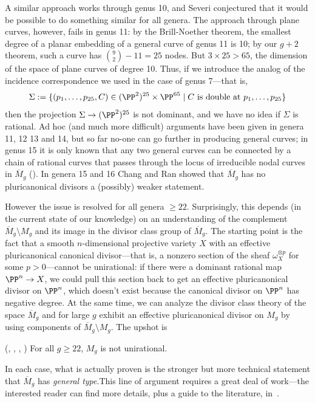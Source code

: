 A similar approach works through genus 10, and Severi conjectured that it would be possible to do something similar for all genera. The approach through plane curves, however, fails in genus 11: by the Brill-Noether theorem, the smallest degree of a planar embedding of a general curve of genus 11 is 10; by our $g+2$ theorem, such a curve has ${9\choose 2}-11 = 25$ nodes. But $3 \times 25 > 65$, the dimension of the space of plane curves of degree 10. Thus, if we introduce the analog of the incidence correspondence we used in the case of genus 7---that is,
$$
\Sigma := \{ (p_1,\dots,p_{25},C) \in (\PP^2)^{25} \times \PP^{65} \mid C \text{ is double at } p_1,\dots,p_{25} \}
$$
then the projection $\Sigma \to (\PP^2)^{25}$ is not dominant, and we have no idea if $\Sigma$ is rational.
 Ad hoc (and much more difficult) arguments have been given in genera 11, 12 13 and 14, but so far no-one can go further in producing general curves; in genus 15 it is only known that
 any two general curves can be connected by a chain of rational curves that passes through
 the locus of irreducible nodal curves in $\overline M_{g}$ (\cite{MR2202246}). In genera 15 and 16 Chang and Ran showed that $\overline M_{g}$ has no pluricanonical divisors a (possibly) weaker statement. 
 

 
However the issue is resolved for all genera $\geq 22$. Surprisingly, this depends (in the current state of our knowledge) on an understanding of the complement
$\overline M_{g}\setminus M_{g}$ and its image in the divisor class group of $\overline M_{g}$. The starting point is the fact that a smooth $n$-dimensional projective variety $X$ with an effective pluricanonical canonical divisor---that is, a nonzero section of the sheaf $\omega_{X}^{\otimes p}$ for some $p>0$---cannot be unirational: if there were a dominant rational map $\PP^n \to X$, we could pull this section back to get an effective pluricanonical divisor on $\PP^n$, which doesn't exist because
the canonical divisor on $\PP^{n}$ has negative degree. At the same time, we can analyze the divisor class theory of the space $\overline M_g$ and for large $g$ exhibit an effective pluricanonical divisor on $M_g$ by using components of  $\overline M_{g}\setminus M_{g}$. 
The upshot is 
\begin{theorem}(\cite{Harris-MumfordModuli}, \cite{HarrisModuli}, \cite{Eisenbud-HarrisModuli}, \cite{M22-23})
For all $g \geq 22$, $M_g$ is not unirational.
\end{theorem}
In each case, what is actually proven is the stronger but more technical statement that $\overline M_g$ has \emph{general type}.This line of argument requires a great deal of work---the interested reader can find more details, plus a guide to the literature, in~\cite{MR1631825}. 

